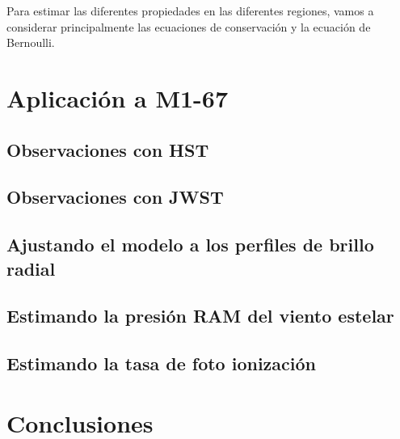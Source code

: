 \documentclass{book}
\begin{document}
Para estimar las diferentes propiedades en las diferentes regiones, vamos a considerar principalmente las ecuaciones de conservación y la ecuación de Bernoulli.

\chapter{Aplicación a M1-67}

\section{Observaciones con HST}

\section{Observaciones con JWST}

\section{Ajustando el modelo a los perfiles de brillo radial}

\section{Estimando la presión RAM del viento estelar}

\section{Estimando la tasa de foto ionización}

\chapter{Conclusiones}
\end{document}
